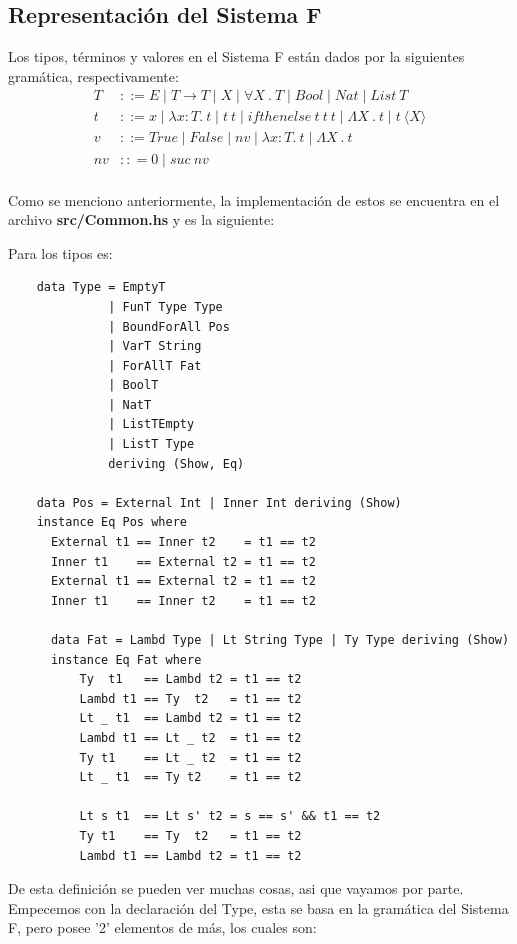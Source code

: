 \documentclass[12pt, titlepage, a4paper]{article}
\begin{document}
\subsection{Representación del Sistema F}
Los tipos, términos y valores en el Sistema F están dados por la siguientes gramática, respectivamente:
\begin{align*}
    T &::= E \mid T \rightarrow T \mid X \mid \forall X \ . \ T \mid Bool \mid Nat \mid List \ T\\
    t &::= x \mid \lambda x:T. \ t \mid t \ t \mid ifthenelse \ t \ t \ t \mid \Lambda X \ . \ t \mid t \ \langle X \rangle \\
    v &::= True \mid False \mid nv \mid \lambda x:T. \ t \mid \Lambda X \ . \ t \\
    nv &:: = 0 \mid suc \ nv \\
\end{align*}

Como se menciono anteriormente, la implementación de estos se encuentra en el archivo \textbf{src/Common.hs} y es la siguiente:

\noindent Para los tipos es:
\begin{verbatim}
    data Type = EmptyT 
              | FunT Type Type
              | BoundForAll Pos
              | VarT String
              | ForAllT Fat
              | BoolT
              | NatT
              | ListTEmpty
              | ListT Type
              deriving (Show, Eq)

    data Pos = External Int | Inner Int deriving (Show)
    instance Eq Pos where
      External t1 == Inner t2    = t1 == t2
      Inner t1    == External t2 = t1 == t2
      External t1 == External t2 = t1 == t2
      Inner t1    == Inner t2    = t1 == t2
    
      data Fat = Lambd Type | Lt String Type | Ty Type deriving (Show)
      instance Eq Fat where
          Ty  t1   == Lambd t2 = t1 == t2
          Lambd t1 == Ty  t2   = t1 == t2
          Lt _ t1  == Lambd t2 = t1 == t2
          Lambd t1 == Lt _ t2  = t1 == t2
          Ty t1    == Lt _ t2  = t1 == t2
          Lt _ t1  == Ty t2    = t1 == t2
      
          Lt s t1  == Lt s' t2 = s == s' && t1 == t2 
          Ty t1    == Ty  t2   = t1 == t2
          Lambd t1 == Lambd t2 = t1 == t2
\end{verbatim}

De esta definición se pueden ver muchas cosas, asi que vayamos por parte. Empecemos con la declaración del Type, esta se basa en la gramática del Sistema F, pero 
posee '2' elementos de más, los cuales son: 
\end{document}
